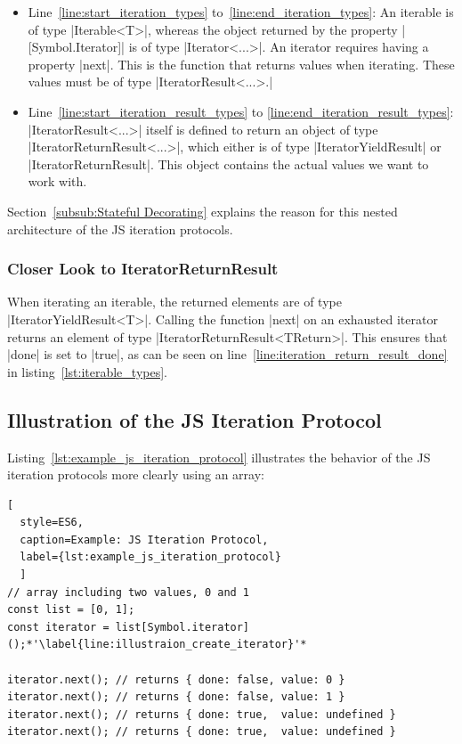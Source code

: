 \begin{itemize}
  \item{Line~\ref{line:start_iteration_types} to~\ref{line:end_iteration_types}: 
      An iterable is of type |Iterable<T>|, whereas the object returned by the property
      |[Symbol.Iterator]| is of type |Iterator<...>|. An iterator requires having a property |next|. 
      This is the function that returns values when iterating. These values must be 
      of type |IteratorResult<...>.|
    }
  \item{Line~\ref{line:start_iteration_result_types} to \ref{line:end_iteration_result_types}:
      |IteratorResult<...>| itself is defined to return an 
      object of type |IteratorReturnResult<...>|, which either is of type
      |IteratorYieldResult| or |IteratorReturnResult|. This object contains the actual 
      values we want to work with.}
\end{itemize}

Section~\ref{subsub:Stateful Decorating} explains the reason for this nested
architecture of the JS iteration protocols.

\subsubsection{Closer Look to IteratorReturnResult}
\label{subsub:Closer look to IteratorReturnResult}
When iterating an iterable, the returned elements are of type
|IteratorYieldResult<T>|. Calling the function |next| on an exhausted iterator
returns an element of type |IteratorReturnResult<TReturn>|. This ensures that
|done| is set to |true|, as can be seen on
line~\ref{line:iteration_return_result_done} in
listing~\ref{lst:iterable_types}.

\subsection{Illustration of the JS Iteration Protocol}
\label{sub:Illustration of the JS Iteration Protocol}
Listing~\ref{lst:example_js_iteration_protocol} illustrates the behavior of the
JS iteration protocols more clearly using an array:
\begin{lstlisting}[
  style=ES6, 
  caption=Example: JS Iteration Protocol,
  label={lst:example_js_iteration_protocol}
  ]
// array including two values, 0 and 1
const list = [0, 1];
const iterator = list[Symbol.iterator]();*'\label{line:illustraion_create_iterator}'*

iterator.next(); // returns { done: false, value: 0 }
iterator.next(); // returns { done: false, value: 1 }
iterator.next(); // returns { done: true,  value: undefined }
iterator.next(); // returns { done: true,  value: undefined }
\end{lstlisting}

